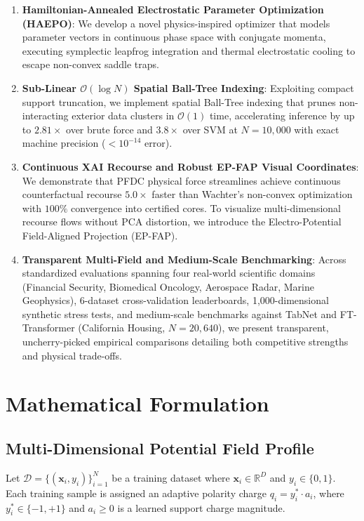 \documentclass[preprint,review,12pt]{elsarticle}
\newcommand{\FloatBarrier}{\clearpage}
\begin{document}
\begin{enumerate}
    \item \textbf{Hamiltonian-Annealed Electrostatic Parameter Optimization (HAEPO)}: We develop a novel physics-inspired optimizer that models parameter vectors in continuous phase space with conjugate momenta, executing symplectic leapfrog integration and thermal electrostatic cooling to escape non-convex saddle traps.
    \item \textbf{Sub-Linear $\mathcal{O}(\log N)$ Spatial Ball-Tree Indexing}: Exploiting compact support truncation, we implement spatial Ball-Tree indexing that prunes non-interacting exterior data clusters in $\mathcal{O}(1)$ time, accelerating inference by up to $2.81\times$ over brute force and $3.8\times$ over SVM at $N=10,000$ with exact machine precision ($< 10^{-14}$ error).
    \item \textbf{Continuous XAI Recourse and Robust EP-FAP Visual Coordinates}: We demonstrate that PFDC physical force streamlines achieve continuous counterfactual recourse $5.0\times$ faster than Wachter's non-convex optimization with $100\%$ convergence into certified cores. To visualize multi-dimensional recourse flows without PCA distortion, we introduce the Electro-Potential Field-Aligned Projection (EP-FAP).
    \item \textbf{Transparent Multi-Field and Medium-Scale Benchmarking}: Across standardized evaluations spanning four real-world scientific domains (Financial Security, Biomedical Oncology, Aerospace Radar, Marine Geophysics), 6-dataset cross-validation leaderboards, 1,000-dimensional synthetic stress tests, and medium-scale benchmarks against TabNet and FT-Transformer (California Housing, $N=20,640$), we present transparent, uncherry-picked empirical comparisons detailing both competitive strengths and physical trade-offs.
\end{enumerate}

\FloatBarrier

\section{Mathematical Formulation}

\subsection{Multi-Dimensional Potential Field Profile}
Let $\mathcal{D} = \{(\mathbf{x}_i, y_i)\}_{i=1}^N$ be a training dataset where $\mathbf{x}_i \in \mathbb{R}^D$ and $y_i \in \{0, 1\}$. Each training sample is assigned an adaptive polarity charge $q_i = y_i^* \cdot a_i$, where $y_i^* \in \{-1, +1\}$ and $a_i \ge 0$ is a learned support charge magnitude.
\end{document}
